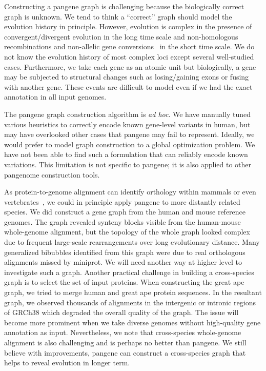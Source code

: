\documentclass[webpdf,contemporary,large,namedate]{oup-authoring-template}%
\begin{document}
Constructing a pangene graph is challenging because the biologically correct graph is unknown.
We tend to think a ``correct'' graph should model the evolution history in principle.
However, evolution is complex in the presence of convergent/divergent evolution in the long time scale
and non-homologous recombinations and non-allelic gene conversions~\citep{Vollger:2023aa} in the short time scale.
We do not know the evolution history of most complex loci except several well-studied cases.
Furthermore, we take each gene as an atomic unit but biologically,
a gene may be subjected to structural changes such as losing/gaining exons or fusing with another gene.
These events are difficult to model even if we had the exact annotation in all input genomes.

The pangene graph construction algorithm is \emph{ad hoc}.
We have manually tuned various heuristics to correctly encode known gene-level variants in human,
but may have overlooked other cases that pangene may fail to represent.
Ideally, we would prefer to model graph construction to a global optimization problem.
We have not been able to find such a formulation that can reliably encode known variations.
This limitation is not specific to pangene; it is also applied to other pangenome construction tools.

As protein-to-genome alignment can identify orthology within mammals or even vertebrates~\citep{Li:2023ac},
we could in principle apply pangene to more distantly related species.
We did construct a gene graph from the human and mouse reference genomes.
The graph revealed synteny blocks visible from the human-mouse whole-genome alignment,
but the topology of the whole graph looked complex due to frequent large-scale rearrangements over long evolutionary distance.
Many generalized bibubbles identified from this graph were due to real orthologous alignments missed by miniprot.
We will need another way at higher level to investigate such a graph.
Another practical challenge in building a cross-species graph is to select the set of input proteins.
When constructing the great ape graph, we tried to merge human and great ape protein sequences.
In the resultant graph, we observed thousands of alignments in the intergenic or intronic regions of GRCh38
which degraded the overall quality of the graph.
The issue will become more prominent when we take diverse genomes without high-quality gene annotation as input.
Nevertheless, we note that cross-species whole-genome alignment is also challenging and is perhaps no better than pangene.
We still believe with improvements, pangene can construct a cross-species graph that helps to reveal evolution in longer term.
\end{document}

